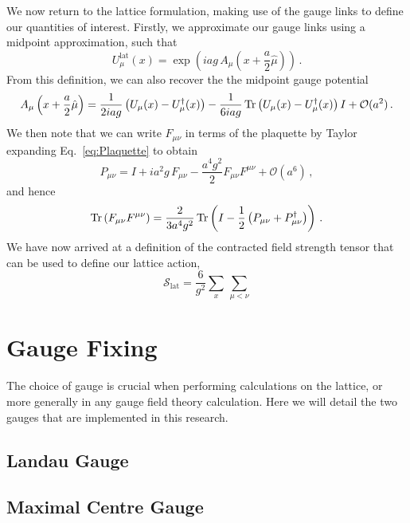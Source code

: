 We now return to the lattice formulation, making use of the gauge links to define our quantities of interest. Firstly, we approximate our gauge links using a midpoint approximation, such that
\begin{equation}
U_\mu^\text{lat}(x) = \exp\left(iag\, A_\mu\left(x+\frac{a}{2}\hat{\mu}\right)\right)\, .
\label{eq:GaugeLinkLat}
\end{equation}
From this definition, we can also recover the the midpoint gauge potential
\begin{equation}
A_\mu\left(x+\frac{a}{2}\hat{\mu}\right) = \frac{1}{2iag}\left(U_\mu(x) - U_\mu^\dag(x)\right) - \frac{1}{6iag}\operatorname{Tr}\left(U_\mu(x) - U_\mu^\dag(x)\right)I + \mathcal{O}(a^2)\, .
\label{eq:GaugePotentialLat}
\end{equation}
We then note that we can write $F_{\mu\nu}$ in terms of the plaquette by Taylor expanding Eq.~\ref{eq:Plaquette} to obtain~\cite{Gupta:1997nd}
\begin{equation}
P_{\mu\nu} = I+ia^2g\, F_{\mu\nu} - \frac{a^4 g^2}{2}F_{\mu\nu}F^{\mu\nu} +\mathcal{O}(a^6)\, ,
\end{equation} 
and hence
\begin{align}
\operatorname{Tr}\left(F_{\mu\nu}F^{\mu\nu}\right) = \frac{2}{3a^4 g^2}\operatorname{Tr}\left(I-\frac{1}{2}\left(P_{\mu\nu}+P_{\mu\nu}^\dag\right)\right)\, .
\end{align}
We have now arrived at a definition of the contracted field strength tensor that can be used to define our lattice action,
\begin{equation}
\mathcal{S}_\text{lat} = \frac{6}{g^2}\sum_x\,\sum_{\mu<\nu} 
\end{equation} 
\section{Gauge Fixing}
The choice of gauge is crucial when performing calculations on the lattice, or more generally in any gauge field theory calculation. Here we will detail the two gauges that are implemented in this research.

\subsection{Landau Gauge}

\subsection{Maximal Centre Gauge}


